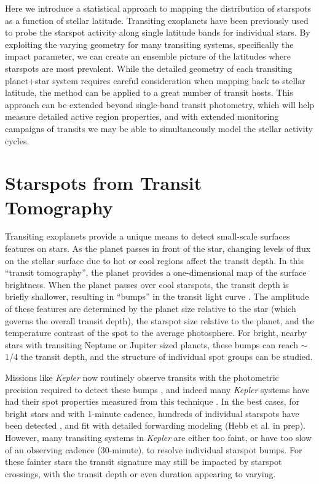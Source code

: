 \documentclass[preprint2]{aastex61}
\newcommand{\Kepler}{\textsl{Kepler}\xspace}
\begin{document}
Here we introduce a statistical approach to mapping the distribution of starspots as a function of stellar latitude. Transiting exoplanets have been previously used to probe the starspot activity along single latitude bands for individual stars. By exploiting the varying geometry for many transiting systems, specifically the impact parameter, we can create an ensemble picture of the latitudes where starspots are most prevalent. While the detailed geometry of each transiting planet+star system requires careful consideration when mapping back to stellar latitude, the method can be applied to a great number of transit hosts. This approach can be extended beyond single-band transit photometry, which will help measure detailed active region properties, and with extended monitoring campaigns of transits we may be able to simultaneously model the stellar activity cycles.





\section{Starspots from Transit Tomography}
\label{sec:transit}

Transiting exoplanets provide a unique means to detect small-scale surfaces features on stars. As the planet passes in front of the star, changing levels of flux on the stellar surface due to hot or cool regions affect the transit depth. In this ``transit tomography'', the planet provides a one-dimensional map of the surface brightness. When the planet passes over cool starspots, the transit depth is briefly shallower, resulting in ``bumps'' in the transit light curve \citep{silva2003}. The amplitude of these features are determined by the planet size relative to the star (which governs the overall transit depth), the starspot size relative to the planet, and the temperature contrast of the spot to the average photosphere. For bright, nearby stars with transiting Neptune or Jupiter sized planets, these bumps can reach $\sim$1/4 the transit depth, and the structure of individual spot groups can be studied. 

Missions like \Kepler now routinely observe transits with the photometric precision required to detect these bumps \citep{borucki2010}, and indeed many \Kepler systems have had their spot properties measured from this technique \citep[e.g.][]{sanchis-ojeda2011, sanchis-ojeda2013}. In the best cases, for bright stars and with 1-minute cadence, hundreds of individual starspots have been detected \citep[e.g.][]{davenport_phd}, and fit with detailed forwarding modeling (Hebb et al. in prep). However, many transiting systems in \Kepler are either too faint, or have too slow of an observing cadence (30-minute), to resolve individual starspot bumps. For these fainter stars the transit signature may still be impacted by starspot crossings, with the transit depth or even duration appearing to varying. 
\end{document}
